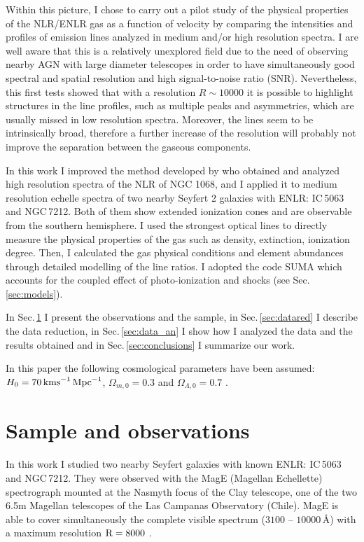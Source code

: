 \documentclass[../thesis.tex]{subfiles}
\begin{document}
Within this picture, I chose to carry out a pilot study of the physical properties of the NLR/ENLR gas as a function of velocity by comparing the intensities and profiles of emission lines analyzed in medium and/or high resolution spectra.
I are well aware that this is a relatively unexplored field due to the need of observing nearby AGN with large diameter telescopes in order to have simultaneously good spectral and spatial resolution and high signal-to-noise ratio (SNR).
Nevertheless, this first tests showed that with a resolution $R \sim  10000$ it is possible to highlight structures in the line profiles, such as multiple peaks and asymmetries, which are usually missed in low resolution spectra. 
Moreover, the lines seem to be intrinsically broad, therefore a further increase of the resolution will probably not improve the separation between the gaseous components.

In this work I improved the method developed by \citet{Ozaki09} who obtained and analyzed high resolution spectra of the NLR of NGC 1068, and I applied it to medium resolution echelle spectra of two nearby Seyfert 2 galaxies with ENLR: IC\,5063 and NGC\,7212.
Both of them show extended ionization cones and are observable from the southern hemisphere.
I used the strongest optical lines to directly measure the physical properties of the gas such as density, extinction, ionization degree. 
Then, I calculated the gas physical conditions and element abundances through detailed modelling of the line ratios. 
I adopted the code SUMA \citep{Contini12} which accounts for the coupled effect of photo-ionization and shocks (see Sec.\,\ref{sec:models}).

In Sec.\,\ref{sec:sample} I present the observations and the sample, in Sec.\,\ref{sec:datared} I describe the data reduction, in Sec.\,\ref{sec:data_an} I show how I analyzed the data and the results obtained and in Sec.\,\ref{sec:conclusions} I summarize our work.

In this paper the following cosmological parameters have been assumed:  $H_0 = 70\,\si{\kms\,Mpc^{-1}}$, $\Omega_{m,0}=0.3$ and $\Omega_{\Lambda,0}=0.7$ \citep{Komatsu11}.





\section{Sample and observations}
\label{sec:sample}

In this work I studied two nearby Seyfert galaxies with known ENLR: IC\,5063 and NGC\,7212.
They were observed with the MagE (Magellan Echellette) spectrograph mounted at the Nasmyth focus of the Clay telescope, one of the two 6.5m Magellan telescopes of the Las Campanas Observatory (Chile).
MagE is able to cover simultaneously the complete visible spectrum ($3100$ -- $10000\,\si{\angstrom}$) with a maximum resolution $\rm R=8000$ \citep{Marshall08}.
\end{document}
